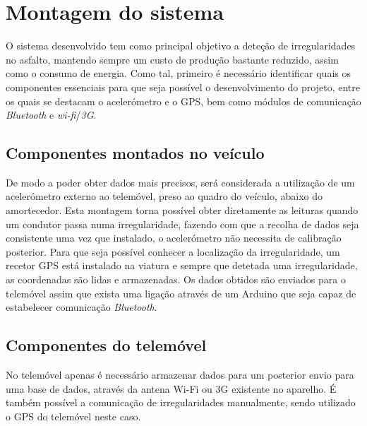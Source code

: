 \section{Montagem do sistema}
\label{sec:montagem_do_sistema}

O sistema desenvolvido tem como principal objetivo a deteção de irregularidades no asfalto, mantendo sempre um custo de produção bastante reduzido, assim como o consumo de energia. Como tal, primeiro é necessário identificar quais os componentes essenciais para que seja possível o desenvolvimento do projeto, entre os quais se destacam o acelerómetro e o GPS, bem como módulos de comunicação \emph{Bluetooth} e \emph{wi-fi}/\emph{3G}.

\subsection{Componentes montados no veículo}
\label{subsec: componentes_montados_no_veiculo}

De modo a poder obter dados mais precisos, será considerada a utilização de um acelerómetro externo ao telemóvel, preso ao quadro do veículo, abaixo do amortecedor.
Esta montagem torna possível obter diretamente as leituras quando um condutor passa numa irregularidade, fazendo com que a recolha de dados seja consistente uma vez que instalado, o acelerómetro não necessita de calibração posterior.
Para que seja possível conhecer a localização da irregularidade, um recetor GPS está instalado na viatura e sempre que detetada uma irregularidade, as coordenadas são lidas e armazenadas.
Os dados obtidos são enviados para o telemóvel assim que exista uma ligação através de um Arduino que seja capaz de estabelecer comunicação \emph{Bluetooth}.

\subsection{Componentes do telemóvel}
\label{subsec: componentes_do_telemovel}

No telemóvel apenas é necessário armazenar dados para um posterior envio para uma base de dados, através da antena Wi-Fi ou 3G existente no aparelho.
É também possível a comunicação de irregularidades manualmente, sendo utilizado o GPS do telemóvel neste caso.